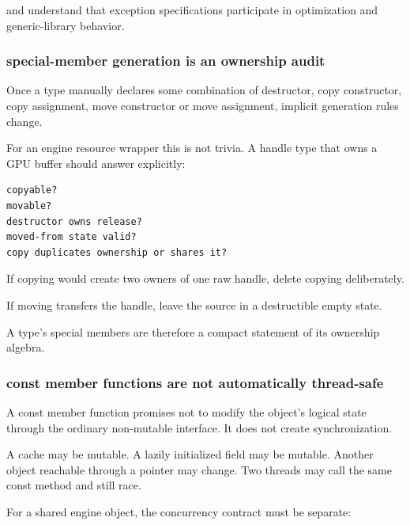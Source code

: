 and understand that exception specifications participate in optimization and generic-library behavior.

\subsubsection{special-member generation is an ownership audit}\label{01-foundations-i-ch005-special-member-generation-is-an-ownership-audit}

\hypertarget{01-foundations-i-ch005-special-member-generation-is-an-ownership-audit}{}

Once a type manually declares some combination of destructor, copy constructor, copy assignment, move constructor or move assignment, implicit generation rules change.

For an engine resource wrapper this is not trivia. A handle type that owns a GPU buffer should answer explicitly:

\begin{verbatim}
copyable?
movable?
destructor owns release?
moved-from state valid?
copy duplicates ownership or shares it?
\end{verbatim}

If copying would create two owners of one raw handle, delete copying deliberately.

If moving transfers the handle, leave the source in a destructible empty state.

A type's special members are therefore a compact statement of its ownership algebra.

\subsubsection{const member functions are not automatically thread-safe}\label{01-foundations-i-ch005-const-member-functions-are-not-automatically-thread-safe}

\hypertarget{01-foundations-i-ch005-const-member-functions-are-not-automatically-thread-safe}{}

A const member function promises not to modify the object's logical state through the ordinary non-mutable interface. It does not create synchronization.

A cache may be mutable. A lazily initialized field may be mutable. Another object reachable through a pointer may change. Two threads may call the same const method and still race.

For a shared engine object, the concurrency contract must be separate:

